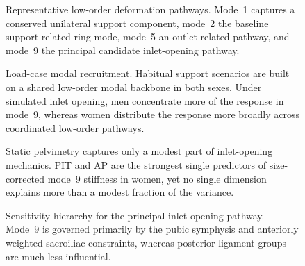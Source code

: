 \documentclass[openacc]{rsproca_new}
\begin{document}
\begin{figure}[p]
\centering
{}
\caption{Representative low-order deformation pathways. Mode~1 captures a conserved unilateral support component, mode~2 the baseline support-related ring mode, mode~5 an outlet-related pathway, and mode~9 the principal candidate inlet-opening pathway.}
\label{fig:modeshapes}
\end{figure}

\begin{figure}[p]
\centering
{}
\caption{Load-case modal recruitment. Habitual support scenarios are built on a shared low-order modal backbone in both sexes. Under simulated inlet opening, men concentrate more of the response in mode~9, whereas women distribute the response more broadly across coordinated low-order pathways.}
\label{fig:recruitment}
\end{figure}

\begin{figure}[p]
\centering
{}
\caption{Static pelvimetry captures only a modest part of inlet-opening mechanics. PIT and AP are the strongest single predictors of size-corrected mode~9 stiffness in women, yet no single dimension explains more than a modest fraction of the variance.}
\label{fig:pelvimetry}
\end{figure}

\begin{figure}[p]
\centering
{}
\caption{Sensitivity hierarchy for the principal inlet-opening pathway. Mode~9 is governed primarily by the pubic symphysis and anteriorly weighted sacroiliac constraints, whereas posterior ligament groups are much less influential.}
\label{fig:sensitivity}
\end{figure}

\clearpage
\printbibliography
\end{document}
